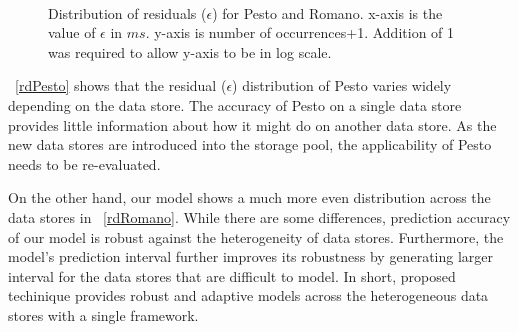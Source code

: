 \begin{figure}[!t]
\centering
{}\\
\captionsetup{format=myformat}
\caption{Distribution of residuals ($\epsilon$) for Pesto and Romano.
x-axis is the value of $\epsilon$ in $ms$.
y-axis is number of occurrences+1.
Addition of 1 was required to allow y-axis to be in log scale.
}
\label{residualDist}
\end{figure}
\figurename~\ref{rdPesto} shows that the residual ($\epsilon$) distribution of Pesto varies widely depending on the data store.
The accuracy of Pesto on a single data store provides little information about how it might do on another data store.
As the new data stores are introduced into the storage pool, the applicability of Pesto needs to be re-evaluated.

On the other hand, our model shows a much more even distribution across the data stores in \figurename~\ref{rdRomano}.
While there are some differences, prediction accuracy of our model is robust against the heterogeneity of data stores.
Furthermore, the model's prediction interval further improves its robustness by generating larger interval for the data stores that are difficult to model.
In short, proposed techinique provides robust and adaptive models across the heterogeneous data stores with a single framework.
